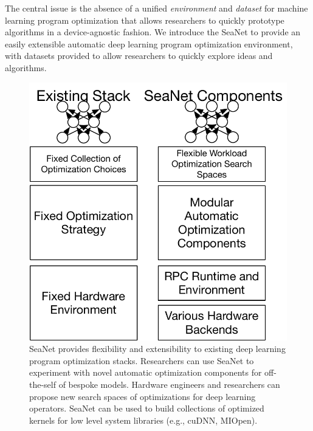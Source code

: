The central issue is the absence of a unified \emph{environment} and \emph{dataset} for machine learning program optimization that allows researchers to quickly prototype algorithms in a device-agnostic fashion.
We introduce the SeaNet to provide an easily extensible automatic deep learning program optimization environment, with datasets provided to allow researchers to quickly explore ideas and algorithms.
\begin{figure}[ht]
\includegraphics[width=\textwidth]{sys_diagrams/overview2.pdf}
\caption{SeaNet provides flexibility and extensibility to existing deep learning program optimization stacks.
Researchers can use SeaNet to experiment with novel automatic optimization components for off-the-self of bespoke models. Hardware engineers and researchers can propose new search spaces of optimizations for deep learning operators. SeaNet can be used to build collections of optimized kernels for low level system libraries (e.g., cuDNN, MIOpen).}
\end{figure}


